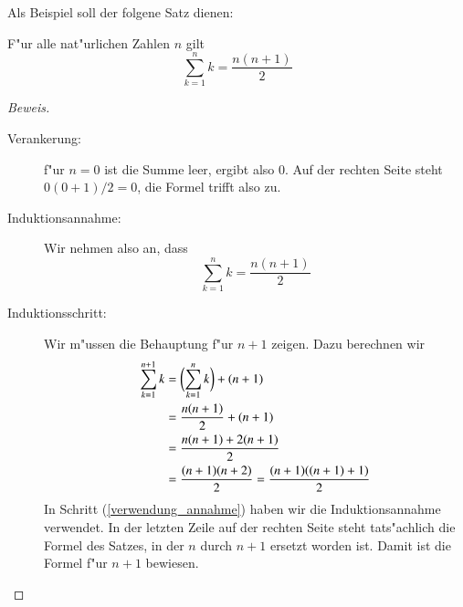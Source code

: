 Als Beispiel soll der folgene Satz dienen:

\begin{satz} F"ur alle nat"urlichen Zahlen $n$ gilt
\[
\sum_{k=1}^nk=\frac{n(n+1)}2
\]
\end{satz}
\begin{proof}[Beweis]
\begin{description}
\item[Verankerung:] f"ur $n=0$ ist die Summe leer, ergibt also $0$.
Auf der rechten Seite steht $0(0+1)/2=0$, die Formel trifft also zu.
\item[Induktionsannahme:]Wir nehmen also an, dass
\[
\sum_{k=1}^nk=\frac{n(n+1)}2
\]
\item[Induktionsschritt:] Wir m"ussen die Behauptung f"ur $n+1$ zeigen. Dazu
berechnen wir
\begin{align}
\sum_{k=1}^{n+1}k&=\biggl(\sum_{k=1}^nk\biggr) + (n+1)\notag\\
&=\frac{n(n+1)}2+(n+1)\label{verwendung_annahme}\\
&=\frac{n(n+1)+2(n+1)}2\notag\\
&=\frac{(n+1)(n+2)}2=\frac{(n+1)((n+1)+1)}2\notag
\end{align}
In Schritt (\ref{verwendung_annahme}) haben wir die Induktionsannahme
verwendet. In der letzten Zeile auf der rechten Seite steht tats"achlich
die Formel des Satzes, in der $n$ durch $n+1$ ersetzt worden ist.
Damit ist die Formel f"ur $n+1$ bewiesen.
\end{description}
\end{proof}
